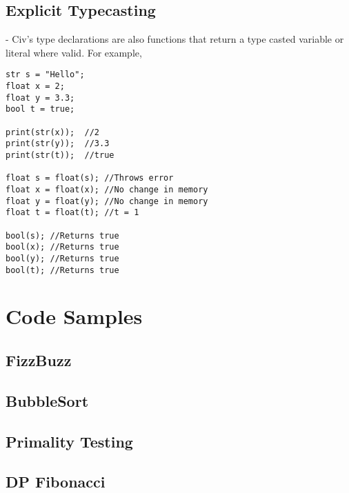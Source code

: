 \documentclass[a4paper]{article}
\begin{document}
\subsection{Explicit Typecasting} - Civ's type declarations are also functions that return a type casted variable or literal where valid. For example,

\begin{lstlisting}
str s = "Hello";
float x = 2;
float y = 3.3;
bool t = true;

print(str(x));  //2
print(str(y));  //3.3
print(str(t));  //true

float s = float(s); //Throws error
float x = float(x); //No change in memory
float y = float(y); //No change in memory
float t = float(t); //t = 1

bool(s); //Returns true
bool(x); //Returns true
bool(y); //Returns true
bool(t); //Returns true
\end{lstlisting}

\section{Code Samples}
\subsection{FizzBuzz}
\subsection{BubbleSort}
\subsection{Primality Testing}
\subsection{DP Fibonacci}
\end{document}
